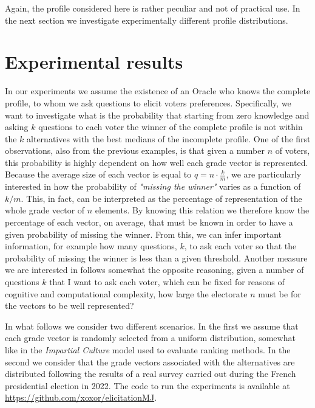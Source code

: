 	Again, the profile considered here is rather peculiar and not of practical use. In the next section we investigate experimentally different profile distributions.


\section{Experimental results}
	
	In our experiments we assume the existence of an Oracle who knows the complete profile, to whom we ask questions to elicit voters preferences. Specifically, we want to investigate what is the probability that starting from zero knowledge and asking $k$ questions to each voter the winner of the complete profile is not within the $k$ alternatives with the best medians of the incomplete profile.
	One of the first observations, also from the previous examples, is that given a number $n$ of voters, this probability is highly dependent on how well each grade vector is represented.
	Because the average size of each vector is equal to $q=n\cdot\frac{k}{m}$, we are particularly interested in how the probability of \textit{"missing the winner"} varies as a function of $k/m$. This, in fact, can be interpreted as the percentage of representation of the whole grade vector of $n$ elements. By knowing this relation we therefore know the percentage of each vector, on average, that must be known in order to have a given probability of missing the winner. From this, we can infer important information, for example how many questions, $k$, to ask each voter so that the probability of missing the winner is less than a given threshold.
	Another measure we are interested in follows somewhat the opposite reasoning, given a number of questions $k$ that I want to ask each voter, which can be fixed for reasons of cognitive and computational complexity, how large the electorate $n$ must be for the vectors to be well represented?
	
	In what follows we consider two different scenarios. In the first we assume that each grade vector is randomly selected from a uniform distribution, somewhat like in the \textit{Impartial Culture} model used to evaluate ranking methods. In the second we consider that the grade vectors associated with the alternatives are distributed following the results of a real survey carried out during the French presidential election in 2022. The code to run the experiments is available at \url{	https://github.com/xoxor/elicitationMJ}.

